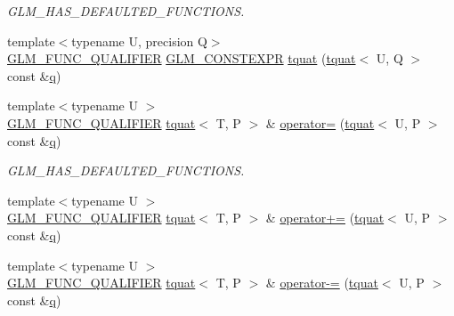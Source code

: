 \begin{DoxyCompactItemize}
\begin{DoxyCompactList}\small\item\em G\+L\+M\+\_\+\+H\+A\+S\+\_\+\+D\+E\+F\+A\+U\+L\+T\+E\+D\+\_\+\+F\+U\+N\+C\+T\+I\+O\+NS. \end{DoxyCompactList}\item 
{\footnotesize template$<$typename U, precision Q$>$ }\\\mbox{\hyperlink{setup_8hpp_a33fdea6f91c5f834105f7415e2a64407}{G\+L\+M\+\_\+\+F\+U\+N\+C\+\_\+\+Q\+U\+A\+L\+I\+F\+I\+ER}} \mbox{\hyperlink{setup_8hpp_a08b807947b47031d3a511f03f89645ad}{G\+L\+M\+\_\+\+C\+O\+N\+S\+T\+E\+X\+PR}} \mbox{\hyperlink{structglm_1_1tquat_a589082b40e5b4c24c6fa6cbc4bd9dea3}{tquat}} (\mbox{\hyperlink{structglm_1_1tquat}{tquat}}$<$ U, Q $>$ const \&\mbox{\hyperlink{glad_8h_a514729309336df22bcc8eda979d6ced4}{q}})
\item 
{\footnotesize template$<$typename U $>$ }\\\mbox{\hyperlink{setup_8hpp_a33fdea6f91c5f834105f7415e2a64407}{G\+L\+M\+\_\+\+F\+U\+N\+C\+\_\+\+Q\+U\+A\+L\+I\+F\+I\+ER}} \mbox{\hyperlink{structglm_1_1tquat}{tquat}}$<$ T, P $>$ \& \mbox{\hyperlink{structglm_1_1tquat_a280d36cd56dabfc93402adb201e87e63}{operator=}} (\mbox{\hyperlink{structglm_1_1tquat}{tquat}}$<$ U, P $>$ const \&\mbox{\hyperlink{glad_8h_a514729309336df22bcc8eda979d6ced4}{q}})
\begin{DoxyCompactList}\small\item\em G\+L\+M\+\_\+\+H\+A\+S\+\_\+\+D\+E\+F\+A\+U\+L\+T\+E\+D\+\_\+\+F\+U\+N\+C\+T\+I\+O\+NS. \end{DoxyCompactList}\item 
{\footnotesize template$<$typename U $>$ }\\\mbox{\hyperlink{setup_8hpp_a33fdea6f91c5f834105f7415e2a64407}{G\+L\+M\+\_\+\+F\+U\+N\+C\+\_\+\+Q\+U\+A\+L\+I\+F\+I\+ER}} \mbox{\hyperlink{structglm_1_1tquat}{tquat}}$<$ T, P $>$ \& \mbox{\hyperlink{structglm_1_1tquat_a90b089779296e6f39f7aa9cddaf3ce83}{operator+=}} (\mbox{\hyperlink{structglm_1_1tquat}{tquat}}$<$ U, P $>$ const \&\mbox{\hyperlink{glad_8h_a514729309336df22bcc8eda979d6ced4}{q}})
\item 
{\footnotesize template$<$typename U $>$ }\\\mbox{\hyperlink{setup_8hpp_a33fdea6f91c5f834105f7415e2a64407}{G\+L\+M\+\_\+\+F\+U\+N\+C\+\_\+\+Q\+U\+A\+L\+I\+F\+I\+ER}} \mbox{\hyperlink{structglm_1_1tquat}{tquat}}$<$ T, P $>$ \& \mbox{\hyperlink{structglm_1_1tquat_a515509c2907fd29e76b0575271a48c2d}{operator-\/=}} (\mbox{\hyperlink{structglm_1_1tquat}{tquat}}$<$ U, P $>$ const \&\mbox{\hyperlink{glad_8h_a514729309336df22bcc8eda979d6ced4}{q}})

\end{DoxyCompactItemize}
